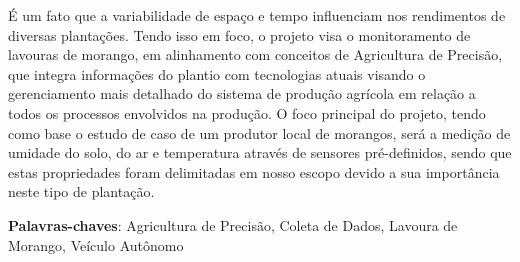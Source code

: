 \begin{resumo}
É um fato que a variabilidade de espaço e tempo influenciam nos rendimentos de diversas plantações.
Tendo isso em foco, o projeto visa o monitoramento de lavouras de morango, em alinhamento com conceitos de Agricultura de
Precisão, que integra informações do plantio com tecnologias atuais visando o gerenciamento mais detalhado do sistema de
produção agrícola em relação a todos os processos envolvidos na produção.
O foco principal do projeto, tendo como base o estudo de caso de um produtor local de morangos, será a medição de umidade do solo,
do ar e temperatura através de sensores pré-definidos, sendo que estas propriedades foram delimitadas em nosso
escopo devido a sua importância neste tipo de plantação.
 \vspace{\onelineskip}

 \noindent
 \textbf{Palavras-chaves}: Agricultura de Precisão, Coleta de Dados, Lavoura de Morango, Veículo Autônomo
\end{resumo}
